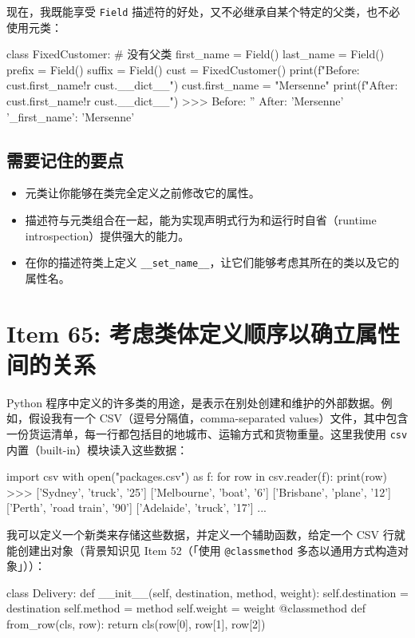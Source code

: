 现在，我既能享受 \texttt{Field} 描述符的好处，又不必继承自某个特定的父类，也不必使用元类：

\begin{codebox}[python]
class FixedCustomer:  # 没有父类
    first_name = Field()
    last_name = Field()
    prefix = Field()
    suffix = Field()
cust = FixedCustomer()
print(f"Before: {cust.first_name!r} {cust.__dict__}")
cust.first_name = "Mersenne"
print(f"After:  {cust.first_name!r} {cust.__dict__}")
>>>
Before: '' {}
After:  'Mersenne' {'_first_name': 'Mersenne'}
\end{codebox}

\subsection{需要记住的要点}

\begin{itemize}
\item 元类让你能够在类完全定义之前修改它的属性。
\item 描述符与元类组合在一起，能为实现声明式行为和运行时自省（runtime introspection）提供强大的能力。
\item 在你的描述符类上定义 \texttt{\_\_set\_name\_\_}，让它们能够考虑其所在的类以及它的属性名。
\end{itemize}

\section{Item 65: 考虑类体定义顺序以确立属性间的关系}

Python 程序中定义的许多类的用途，是表示在别处创建和维护的外部数据。例如，假设我有一个 CSV（逗号分隔值，comma-separated values）文件，其中包含一份货运清单，每一行都包括目的地城市、运输方式和货物重量。这里我使用 \texttt{csv} 内置（built-in）模块读入这些数据：

\begin{codebox}[python]
import csv
with open("packages.csv") as f:
    for row in csv.reader(f):
        print(row)
>>>
['Sydney', 'truck', '25']
['Melbourne', 'boat', '6']
['Brisbane', 'plane', '12']
['Perth', 'road train', '90']
['Adelaide', 'truck', '17']
...
\end{codebox}

我可以定义一个新类来存储这些数据，并定义一个辅助函数，给定一个 CSV 行就能创建出对象（背景知识见 Item 52（「使用 \texttt{@classmethod} 多态以通用方式构造对象」））：

\begin{codebox}[python]
class Delivery:
    def __init__(self, destination, method, weight):
        self.destination = destination
        self.method = method
        self.weight = weight
    @classmethod
    def from_row(cls, row):
        return cls(row[0], row[1], row[2])
\end{codebox}

